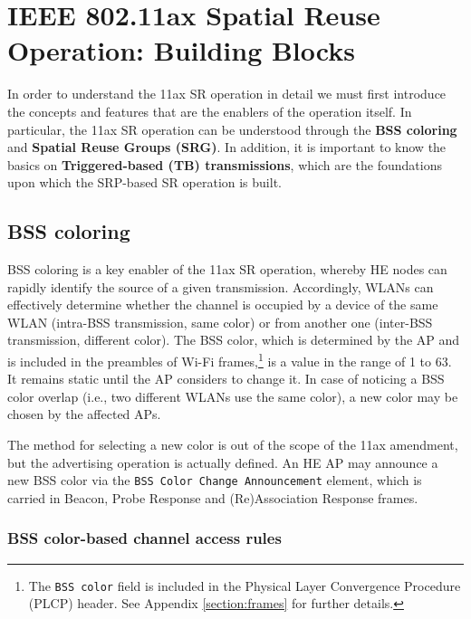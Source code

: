 \documentclass[comsoc]{IEEEtran}
\begin{document}
	\section{IEEE 802.11ax Spatial Reuse Operation: Building Blocks}
	\label{section:enablers_sr_11ax}
	In order to understand the 11ax SR operation in detail we must first introduce the concepts and features that are the enablers of the operation itself. In particular, the 11ax SR operation can be understood through the \textbf{BSS coloring} and \textbf{Spatial Reuse Groups (SRG)}. In addition, it is important to know the basics on \textbf{Triggered-based (TB) transmissions}, which are the foundations upon which the SRP-based SR operation is built.
	
	\subsection{BSS coloring}	
	\label{section:bss_coloring}	
	BSS coloring is a key enabler of the 11ax SR operation, whereby HE nodes can rapidly identify the source of a given transmission. Accordingly, WLANs can effectively determine whether the channel is occupied by a device of the same WLAN (intra-BSS transmission, same color) or from another one (inter-BSS transmission, different color). The BSS color, which is determined by the AP and is included in the preambles of Wi-Fi frames,\footnote{The \texttt{BSS color} field is included in the Physical Layer Convergence Procedure (PLCP) header. See Appendix \ref{section:frames} for further details.} is a value in the range of 1 to 63. It remains static until the AP considers to change it. In case of noticing a BSS color overlap (i.e., two different WLANs use the same color), a new color may be chosen by the affected APs. 
	
	The method for selecting a new color is out of the scope of the 11ax amendment, but the advertising operation is actually defined. An HE AP may announce a new BSS color via the \texttt{BSS Color Change Announcement} element, which is carried in Beacon, Probe Response and (Re)Association Response frames. 
	
	\subsubsection{BSS color-based channel access rules}
	\label{section:bss_color_channel_access}
	
\end{document}
